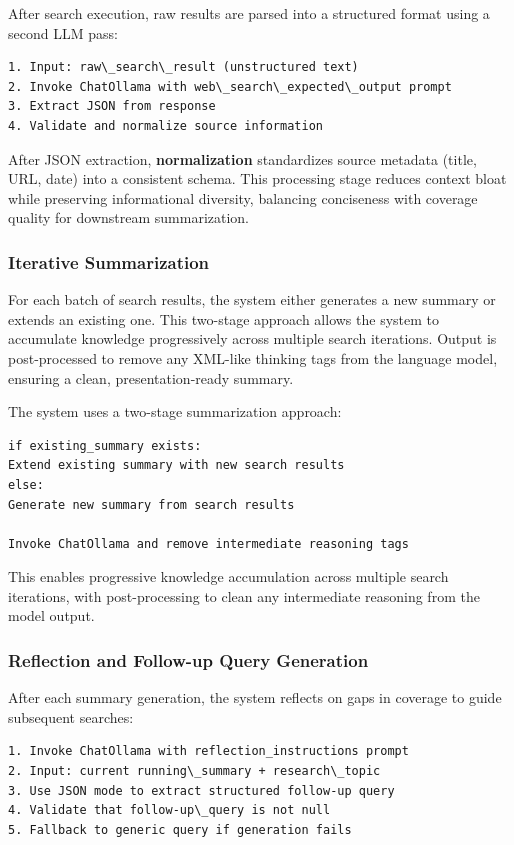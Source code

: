 After search execution, raw results are parsed into a structured format using a second LLM pass:

\begin{lstlisting}
1. Input: raw\_search\_result (unstructured text)
2. Invoke ChatOllama with web\_search\_expected\_output prompt
3. Extract JSON from response
4. Validate and normalize source information
\end{lstlisting}

After JSON extraction, \textbf{normalization} standardizes source metadata (title, URL, date) into a consistent schema. This processing stage reduces context bloat while preserving informational diversity, balancing conciseness with coverage quality for downstream summarization.



\subsubsection{Iterative Summarization}

For each batch of search results, the system either generates a new summary or extends an existing one. This two-stage approach allows the system to accumulate knowledge progressively across multiple search iterations. Output is post-processed to remove any XML-like thinking tags from the language model, ensuring a clean, presentation-ready summary.

The system uses a two-stage summarization approach:

\begin{lstlisting}
if existing_summary exists:
Extend existing summary with new search results
else:
Generate new summary from search results

Invoke ChatOllama and remove intermediate reasoning tags
\end{lstlisting}

This enables progressive knowledge accumulation across multiple search iterations, with post-processing to clean any intermediate reasoning from the model output.

\subsubsection{Reflection and Follow-up Query Generation}

After each summary generation, the system reflects on gaps in coverage to guide subsequent searches:

\begin{lstlisting}
1. Invoke ChatOllama with reflection_instructions prompt
2. Input: current running\_summary + research\_topic
3. Use JSON mode to extract structured follow-up query
4. Validate that follow-up\_query is not null
5. Fallback to generic query if generation fails
\end{lstlisting}


